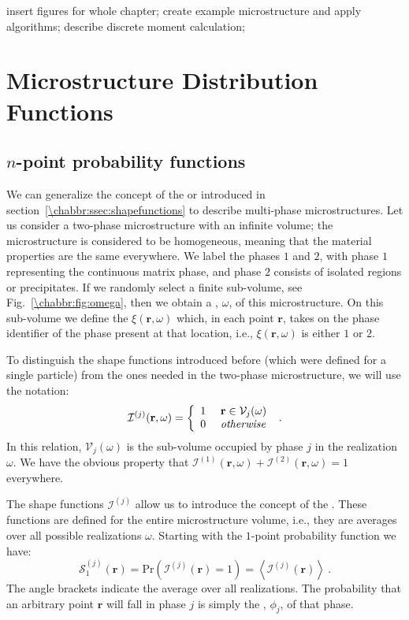 {\color{red}insert figures for whole chapter; create example microstructure and apply algorithms; describe discrete moment calculation; }


\section{Microstructure Distribution Functions}\label{\chabbr:sec:microdist}

\subsection{$n$-point probability functions}\label{\chabbr:ssec:npoint}
We can generalize the concept of the  or  introduced in section~\ref{\chabbr:ssec:shapefunctions} to describe multi-phase microstructures.  Let us consider a two-phase microstructure with an infinite volume; the microstructure is considered to be homogeneous, meaning that the material properties are the same everywhere. We label the phases $1$ and $2$, with phase $1$ representing the continuous matrix phase, and phase $2$ consists of isolated regions or precipitates.  If we randomly select a finite sub-volume, see Fig.~\ref{\chabbr:fig:omega}, then we obtain a , $\omega$, of this microstructure. On this sub-volume we define the  $\xi(\mathbf{r},\omega)$ which, in each point $\mathbf{r}$,  takes on the phase identifier of the phase present at that location, i.e., $\xi(\mathbf{r},\omega)$ is either $1$ or $2$.  

To distinguish the shape functions introduced before (which were defined for a single particle) from the ones needed in the two-phase microstructure, we will use the notation:
\begin{equation}
	\mathcal{I}^{(j)}(\mathbf{r},\omega) = \left\{\begin{array}{cl}1&\,\,\mathbf{r}\in\mathcal{V}_j(\omega)\\ 0&\,\,\text{\it otherwise}\end{array}\right.\ .
\end{equation}
In this relation, $\mathcal{V}_j(\omega)$ is the sub-volume occupied by phase $j$ in the realization $\omega$.  We have the obvious property that $\mathcal{I}^{(1)}(\mathbf{r},\omega)+\mathcal{I}^{(2)}(\mathbf{r},\omega)=1$ everywhere.

The shape functions $\mathcal{I}^{(j)}$ allow us to introduce the concept of the . These functions are defined for the entire microstructure volume, i.e., they are averages over all possible realizations $\omega$. Starting with the $1$-point probability function we have:
\begin{equation}
	\mathcal{S}^{(j)}_1(\mathbf{r}) = \text{Pr}\left(\mathcal{I}^{(j)}(\mathbf{r})=1\right) = \left\langle\mathcal{I}^{(j)}(\mathbf{r})\right\rangle\ .\label{\chabbr:eq:onepoint}
\end{equation}
The angle brackets indicate the average over all realizations. The probability that an arbitrary point $\mathbf{r}$ will fall in phase $j$ is simply the , $\phi_j$, of that phase. 

